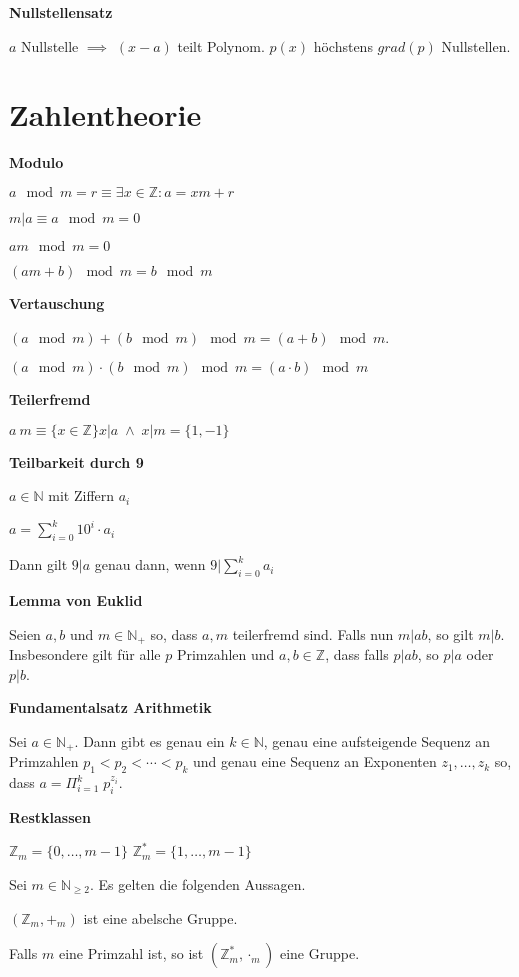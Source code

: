\documentclass[a4paper,10pt]{article}
\newcommand{\N}{\mathbb{N}}
\newcommand{\natnum}{\mathbb{N}}
\newcommand{\Z}{\mathbb{Z}}
\newcommand{\integers}{\mathbb{Z}}
\newcommand{\modulo}{\mod}
\newcommand{\lt}{<}
\begin{document}
\begin{multicols}{3}
\textbf{Nullstellensatz}

$a$ Nullstelle $\implies$ $(x-a)$ teilt Polynom. $p(x)$ höchstens $grad(p)$ Nullstellen.

\section{Zahlentheorie}

\textbf{Modulo}

$a \mod m = r \equiv \exists x \in \Z: a = xm +r$

$m|a \equiv a \mod m = 0$

$am \modulo m = 0$

$(am+b) \modulo m = b \modulo m$

\textbf{Vertauschung}

$(a \modulo m) + (b \modulo m) \modulo m = (a+b) \modulo m$.

$(a \modulo m) \cdot (b \modulo m) \modulo m = (a \cdot b) \modulo m$

\textbf{Teilerfremd}

$a \ m \equiv \{x \in \integers\}{x |a \; \wedge \; x | m} = \{1,-1\}$

\textbf{Teilbarkeit durch 9}

$a \in \N$ mit Ziffern $a_i$

$a = \sum_{i=0}^k 10^i \cdot a_i$

Dann gilt $9 | a$ genau dann, wenn $9 | \sum_{i=0}^k a_i$

\textbf{Lemma von Euklid}

Seien $a,b$ und $m \in \natnum_+$ so, dass $a,m$ teilerfremd sind. Falls nun $m | ab$, so gilt $m|b$.
Insbesondere gilt für alle $p$ Primzahlen und $a,b \in \integers$, dass falls $p | ab$, so $p | a$ oder $p | b$. 

\textbf{Fundamentalsatz Arithmetik}

Sei $a \in \natnum_+$. Dann gibt es genau ein 
$k \in \natnum$, genau eine aufsteigende Sequenz an Primzahlen 
$p_1 \lt p_2 \lt \cdots \lt p_k$ und genau eine Sequenz an Exponenten $z_1,…,z_k$ so, dass $a = \Pi_{i=1}^k \; p_i^{z_i}.$ 

\textbf{Restklassen}

$\integers_m = \{0,…,m-1\}$ $\integers_m^* = \{1,…,m-1\}$

Sei $m \in \natnum_{\geq 2}$. Es gelten die folgenden Aussagen.

$(\integers_m,+_m)$ ist eine abelsche Gruppe.

Falls $m$ eine Primzahl ist, so ist $(\integers_m^*,\cdot_m)$ eine Gruppe.


\end{multicols}
\end{document}
